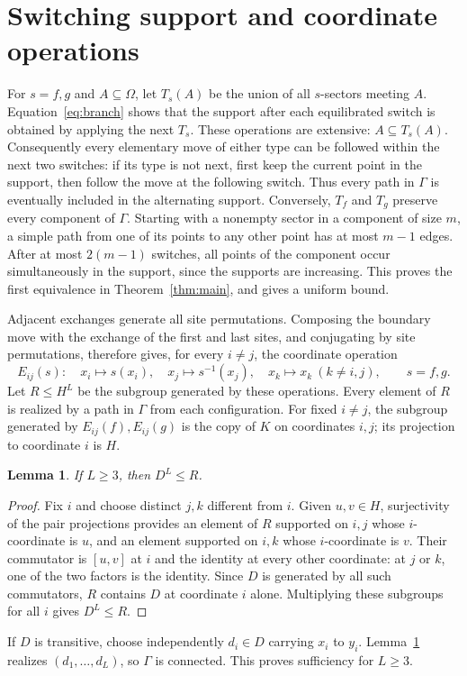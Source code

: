 \documentclass[11pt]{article}
\newtheorem{lemma}[theorem]{Lemma}
\theoremstyle{remark}
\begin{document}
\section{Switching support and coordinate operations}
For $s=f,g$ and $A\subseteq\Omega$, let $T_s(A)$ be the union of all $s$-sectors
meeting $A$. Equation~\eqref{eq:branch} shows that the support after each
equilibrated switch is obtained by applying the next $T_s$.
These operations are extensive: $A\subseteq T_s(A)$.
Consequently every elementary move of either type can be followed within the
next two switches: if its type is not next, first keep the current point in the
support, then follow the move at the following switch.
Thus every path in $\Gamma$ is eventually included in the alternating support.
Conversely, $T_f$ and $T_g$ preserve every component of $\Gamma$.
Starting with a nonempty sector in a component of size $m$, a simple path from
one of its points to any other point has at most $m-1$ edges. After at most
$2(m-1)$ switches, all points of the component occur simultaneously in the
support, since the supports are increasing. This proves the first equivalence
in Theorem~\ref{thm:main}, and gives a uniform bound.

Adjacent exchanges generate all site permutations. Composing the boundary
move with the exchange of the first and last sites, and conjugating by site
permutations, therefore gives, for every $i\ne j$, the coordinate operation
\[
 E_{ij}(s):\quad x_i\longmapsto s(x_i),\quad
 x_j\longmapsto s^{-1}(x_j),\quad x_k\longmapsto x_k\ (k\ne i,j),
 \qquad s=f,g.
\]
Let $R\leq H^L$ be the subgroup generated by these operations.
Every element of $R$ is realized by a path in $\Gamma$ from each configuration.
For fixed $i\ne j$, the subgroup generated by $E_{ij}(f),E_{ij}(g)$ is the
copy of $K$ on coordinates $i,j$; its projection to coordinate $i$ is $H$.

\begin{lemma}\label{lem:coordinate}
If $L\geq3$, then $D^L\leq R$.
\end{lemma}
\begin{proof}
Fix $i$ and choose distinct $j,k$ different from $i$.
Given $u,v\in H$, surjectivity of the pair projections provides an element of
$R$ supported on $i,j$ whose $i$-coordinate is $u$, and an element supported
on $i,k$ whose $i$-coordinate is $v$.
Their commutator is $[u,v]$ at $i$ and the identity at every other coordinate:
at $j$ or $k$, one of the two factors is the identity.
Since $D$ is generated by all such commutators, $R$ contains $D$ at coordinate
$i$ alone. Multiplying these subgroups for all $i$ gives $D^L\leq R$.
\end{proof}
If $D$ is transitive, choose independently $d_i\in D$ carrying $x_i$ to $y_i$.
Lemma~\ref{lem:coordinate} realizes $(d_1,\ldots,d_L)$, so $\Gamma$ is connected.
This proves sufficiency for $L\geq3$.
\end{document}
